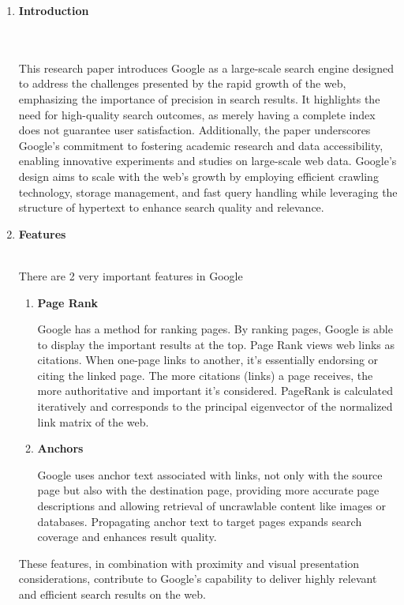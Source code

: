 \documentclass[a4paper, 12pt]{article}
\begin{document}
\begin{enumerate}
\item \textbf{Introduction}
\\\\
    This research paper introduces Google as a large-scale search engine designed to address the challenges presented by the rapid growth of the web, emphasizing the importance of precision in search results. It highlights the need for high-quality search outcomes, as merely having a complete index does not guarantee user satisfaction. Additionally, the paper underscores Google's commitment to fostering academic research and data accessibility, enabling innovative experiments and studies on large-scale web data. Google's design aims to scale with the web's growth by employing efficient crawling technology, storage management, and fast query handling while leveraging the structure of hypertext to enhance search quality and relevance.

\item \textbf{Features}
\\
There are 2 very important features in Google
\begin{enumerate}
    \item \textbf{Page Rank}\\
        Google has a method for ranking pages. By ranking pages, Google is able to display the important results at the top. Page Rank views web links as citations. When one-page links to another, it's essentially endorsing or citing the linked page. The more citations (links) a page receives, the more authoritative and important it's considered. PageRank is calculated iteratively and corresponds to the principal eigenvector of the normalized link matrix of the web.
    \item \textbf{Anchors}
        Google uses anchor text associated with links, not only with the source page but also with the destination page, providing more accurate page descriptions and allowing retrieval of uncrawlable content like images or databases. Propagating anchor text to target pages expands search coverage and enhances result quality. 
\end{enumerate}
 These features, in combination with proximity and visual presentation considerations, contribute to Google's capability to deliver highly relevant and efficient search results on the web.


\end{enumerate}
\end{document}
